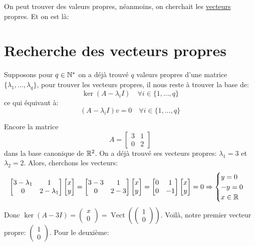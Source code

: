 On peut trouver des valeurs propres, néanmoins, on cherchait les \underline{vecteurs} propres. Et on est là:
\section{Recherche des vecteurs propres}
Supposons pour $q \in \mathbb{N}^{*}$ on a déjà trouvé $q$ valeurs propres d'une matrice $\{ \lambda_1, \ldots, \lambda_q \}$, pour trouver les vecteurs propres, il nous reste à trouver la base de:
\[
    \ker(A - \lambda_iI) \quad \forall i \in \{1, \ldots, q\}
\] 
ce qui équivaut à:
\[
\left( A - \lambda_i I \right)v = 0 \quad \forall i \in \{1, \ldots, q\}
\] 

\begin{eg}
   Encore la matrice  
   \[
       A = \begin{bmatrix} 3 & 1\\ 0 & 2 \end{bmatrix} 
   \] 
   dans la base canonique de $\mathbb{R}^2$. On a déjà trouvé ses vecteurs propres: $\lambda_1 = 3$ et $\lambda_2 = 2$. Alors, cherchons les vecteurs:
   \[
       \begin{bmatrix} 3 - \lambda_1 & 1 \\ 0 & 2 - \lambda_1 \end{bmatrix}\begin{bmatrix} x \\ y \end{bmatrix} = \begin{bmatrix} 3 - 3 & 1 \\ 0 & 2 - 3 \end{bmatrix}\begin{bmatrix} x \\ y \end{bmatrix} = \begin{bmatrix} 0 & 1 \\ 0 & -1 \end{bmatrix}\begin{bmatrix} x \\ y \end{bmatrix} = 0 
       \Rightarrow \begin{cases}
           y = 0\\
           -y = 0\\
           x \in \mathbb{R}
       \end{cases}
   \] 
   Donc $\ker(A - 3I) = \begin{pmatrix} x \\ 0 \end{pmatrix} =  \operatorname{Vect}(\begin{pmatrix} 1 \\ 0 \end{pmatrix} )$. Voilà, notre premier vecteur propre: $\begin{pmatrix} 1 \\ 0 \end{pmatrix} $. Pour le deuxième:

\end{eg}
